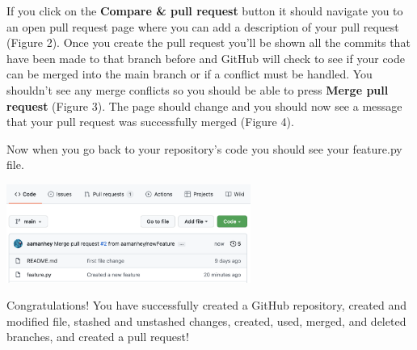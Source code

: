 \documentclass{article}
\begin{document}
If you click on the \textbf{Compare \& pull request} button it should navigate you to an open pull request page where you can add a description of your pull request (Figure 2).
Once you create the pull request you'll be shown all the commits that have been made to that branch before and GitHub will check to see if your code can be merged into the main branch or if a conflict must be handled. You shouldn't see any merge conflicts so you should be able to press \textbf{Merge pull request} (Figure 3).
The page should change and you should now see a message that your pull request was successfully merged (Figure 4).

Now when you go back to your repository's code you should see your feature.py file.

\begin{center}
    \includegraphics[width=8cm]{pr5.png}
\end{center}

\begin{center}
    Congratulations! You have successfully created a GitHub repository, created and modified file, stashed and unstashed changes, created, used, merged, and deleted branches, and created a pull request!
\end{center}
\end{document}
